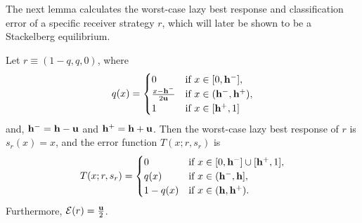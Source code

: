 The next lemma calculates the worst-case lazy best response and classification error of a specific receiver strategy $ r $, which will later be shown to be a Stackelberg equilibrium.

\begin{lem}\label{lem:error is half}
    Let $ r \equiv (1-q,q,0) $, where
    \begin{equation}\label{eqn:q defn}
        q(x) = \begin{cases}
            0 & \text{if } x \in [0,\mathbf{h^{-}}], \\
            \frac{x-\mathbf{h^{-}}}{2\mathbf{u}} & \text{if } x \in (\mathbf{h^{-}},\mathbf{h^{+}}), \\
            1 & \text{if } x \in [\mathbf{h^{+}},1]
        \end{cases}
    \end{equation}
    and, $\mathbf{h^{-}} = \mathbf{h} - \mathbf{u}$ and $\mathbf{h^{+}} = \mathbf{h} + \mathbf{u}$.
    Then the worst-case lazy best response of $ r $ is $ s_r(x) = x $, and the error function $ T(x;r,s_r) $ is
    \[
    T(x;r,s_r) = \begin{cases}
        0 & \text{if } x \in [0,\mathbf{h^{-}}] \cup [\mathbf{h^{+}},1], \\
        q(x) & \text{if } x \in (\mathbf{h^{-}},\mathbf{h}], \\
        1-q(x) & \text{if } x \in (\mathbf{h},\mathbf{h^{+}}).
    \end{cases}
    \]
    Furthermore, $ \mathcal{E}(r) = \frac{\mathbf{u}}{2} $.
\end{lem}

